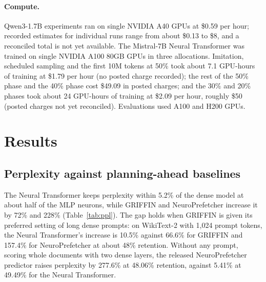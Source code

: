 \documentclass[10pt,twocolumn,letterpaper]{article}
\begin{document}
\paragraph{Compute.} Qwen3-1.7B experiments ran on single NVIDIA A40 GPUs at \$0.59 per hour; recorded estimates for individual runs range from about \$0.13 to \$8, and a reconciled total is not yet available. The Mistral-7B Neural Transformer was trained on single NVIDIA A100 80GB GPUs in three allocations. Imitation, scheduled sampling and the first 10M tokens at 50\% took about 7.1 GPU-hours of training at \$1.79 per hour (no posted charge recorded); the rest of the 50\% phase and the 40\% phase cost \$49.09 in posted charges; and the 30\% and 20\% phases took about 24 GPU-hours of training at \$2.09 per hour, roughly \$50 (posted charges not yet reconciled). Evaluations used A100 and H200 GPUs.

\section{Results}

\subsection{Perplexity against planning-ahead baselines}

The Neural Transformer keeps perplexity within 5.2\% of the dense model at about half of the MLP neurons, while GRIFFIN and NeuroPrefetcher increase it by 72\% and 228\% (Table~\ref{tab:ppl}). The gap holds when GRIFFIN is given its preferred setting of long dense prompts: on WikiText-2 with 1,024 prompt tokens, the Neural Transformer's increase is 10.5\% against 66.6\% for GRIFFIN and 157.4\% for NeuroPrefetcher at about 48\% retention. Without any prompt, scoring whole documents with two dense layers, the released NeuroPrefetcher predictor raises perplexity by 277.6\% at 48.06\% retention, against 5.41\% at 49.49\% for the Neural Transformer.
\end{document}
